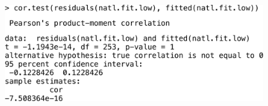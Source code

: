 \begin{frame}
	\begin{figure}[H]
		\centering
		\includegraphics[width=\textwidth]{images/cor-code}
		\label{fig:figure1}
	\end{figure}
\end{frame}
